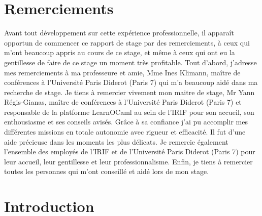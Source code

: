 \documentclass{article}
\begin{document}
\newpage

\tableofcontents
\newpage

\section{Remerciements}
Avant tout développement sur cette expérience professionnelle, il apparaît opportun de commencer ce rapport de stage par des remerciements, à ceux qui m’ont beaucoup appris au cours de ce stage, et même à ceux qui ont eu la gentillesse de faire de ce stage un moment très profitable.
\newline
Tout d'abord, j'adresse mes remerciements à ma professeure et amie, Mme Ines Klimann, maître de conférences à l'Université Paris Diderot (Paris 7) qui m'a beaucoup aidé dans ma recherche de stage.
\newline
Je tiens à remercier vivement mon maitre de stage, Mr Yann Régis-Gianas, maître de conférences à l'Université Paris Diderot (Paris 7) et responsable de la platforme LearnOCaml au sein de l'IRIF pour son accueil, son enthousiasme et ses conseils avisés. Grâce à sa confiance j'ai pu accomplir mes différentes missions en totale autonomie avec rigueur et efficacité. Il fut d'une aide précieuse dans les moments les plus délicats.
\newline 
Je remercie également l'ensemble des employés de l'IRIF et de l'Université Paris Diderot (Paris 7) pour leur accueil, leur gentillesse et leur professionnalisme.
Enfin, je tiens à remercier toutes les personnes qui m'ont conseillé et aidé lors de mon stage.


\newpage

\section{Introduction}
\end{document}
